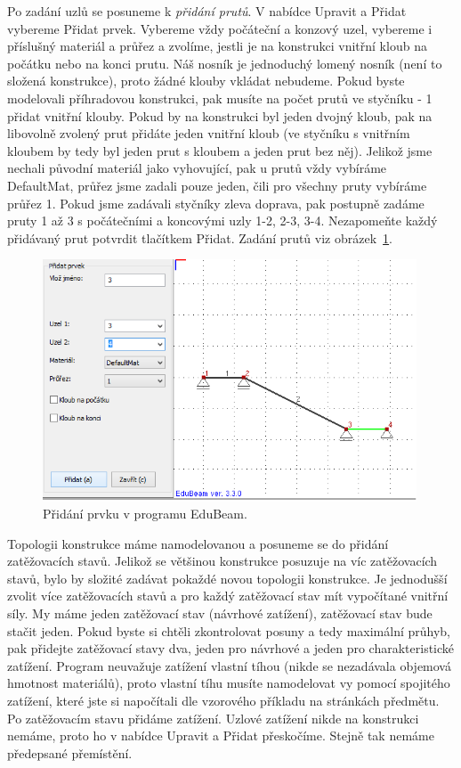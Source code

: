 \documentclass[12pt,fleqn]{article}
\begin{document}
Po zadání uzlů se posuneme k \emph{přidání prutů}. V nabídce Upravit a Přidat vybereme Přidat prvek. Vybereme vždy počáteční a konzový uzel, vybereme i příslušný materiál a průřez a zvolíme, jestli je na konstrukci vnitřní kloub na počátku nebo na konci prutu. Náš nosník je jednoduchý lomený nosník (není to složená konstrukce), proto žádné klouby vkládat nebudeme. Pokud byste modelovali příhradovou konstrukci, pak musíte na počet prutů ve styčníku - 1 přidat vnitřní klouby. Pokud by na konstrukci byl jeden dvojný kloub, pak na libovolně zvolený prut přidáte jeden vnitřní kloub (ve styčníku s vnitřním kloubem by tedy byl jeden prut s kloubem a jeden prut bez něj). Jelikož jsme nechali původní materiál jako vyhovující, pak u prutů vždy vybíráme DefaultMat, průřez jsme zadali pouze jeden, čili pro všechny pruty vybíráme průřez 1. Pokud jsme zadávali styčníky zleva doprava, pak postupně zadáme pruty 1 až 3 s počátečními a koncovými uzly 1-2, 2-3, 3-4. Nezapomeňte každý přidávaný prut potvrdit tlačítkem Přidat. Zadání prutů viz obrázek~\ref{fig:EduBeam_prvek}.

\begin{figure}[ht]
\centering
\includegraphics[width=0.99\textwidth]{figs/eduBeam_prvky.png}\caption{Přidání prvku v programu EduBeam.}\label{fig:EduBeam_prvek}
\end{figure}

Topologii konstrukce máme namodelovanou a posuneme se do přidání zatěžovacích stavů. Jelikož se většinou konstrukce posuzuje na víc zatěžovacích stavů, bylo by složité zadávat pokaždé novou topologii konstrukce. Je jednodušší zvolit více zatěžovacích stavů a pro každý zatěžovací stav mít vypočítané vnitřní síly. My máme jeden zatěžovací stav (návrhové zatížení), zatěžovací stav bude stačit jeden. Pokud byste si chtěli zkontrolovat posuny a tedy maximální průhyb, pak přidejte zatěžovací stavy dva, jeden pro návrhové a jeden pro charakteristické zatížení. Program neuvažuje zatížení vlastní tíhou (nikde se nezadávala objemová hmotnost materiálů), proto vlastní tíhu musíte namodelovat vy pomocí spojitého zatížení, které jste si napočítali dle vzorového příkladu na stránkách předmětu. Po zatěžovacím stavu přidáme zatížení. Uzlové zatížení nikde na konstrukci nemáme, proto ho v nabídce Upravit a Přidat přeskočíme. Stejně tak nemáme předepsané přemístění. 
\end{document}
